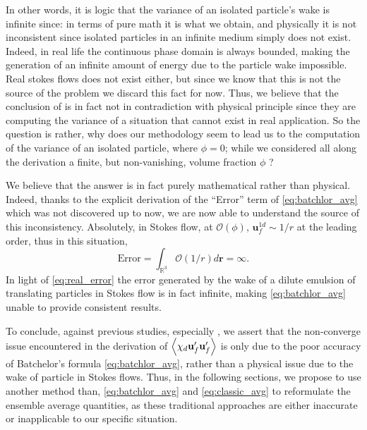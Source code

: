 In other words, it is logic that the variance of an isolated particle's wake is infinite since: in terms of pure math it is what we obtain, and physically it is not inconsistent since isolated particles in an infinite medium simply does not exist.
Indeed, in real life the continuous phase domain is always bounded, making the generation of an infinite amount of energy due to the particle wake impossible. 
Real stokes flows does not exist either, but since we know that this is not the source of the problem \citet{koch1993hydrodynamic} we discard this fact for now. 
Thus, we believe that the conclusion of \citet{caflisch1985variance} is in fact not in contradiction with physical principle since they are computing the variance of a situation that cannot exist in real application. 
So the question is rather, why does our methodology seem to lead us to the computation of the variance of an isolated particle, where $\phi =0$; while we considered all along the derivation a finite, but non-vanishing, volume fraction $\phi$ ?

We believe that the answer is in fact purely mathematical rather than physical. 
Indeed, thanks to the explicit derivation of the ``Error'' term of \ref{eq:batchlor_avg} which was not discovered up to now, we are now able to understand the source of this inconsistency. 
Absolutely, in Stokes flow, at $\mathcal{O}(\phi)$, $\textbf{u}_f^{1d} \sim 1/r$ at the leading order, thus in this situation, 
\begin{equation}
    \text{Error}
    = 
    \int_{\mathbb{R}^3} 
    \mathcal{O}(1/r) d\textbf{r}
    = \infty. 
    \label{eq:real_error}
\end{equation}
In light of \ref{eq:real_error} the error generated by the wake of a dilute emulsion of translating particles in Stokes flow is in fact infinite, making \ref{eq:batchlor_avg} unable to provide consistent results. 


To conclude, against previous studies, especially \citet{caflisch1985variance}, we assert that the non-converge issue encountered in the derivation of $\left<\chi_d \textbf{u}_f'\textbf{u}_f'\right>$ is only due to the poor accuracy of Batchelor's formula \eqref{eq:batchlor_avg}, rather than a physical issue due to the wake of particle in Stokes flows. 
Thus, in the following sections, we propose to use another method than, \ref{eq:batchlor_avg} and \ref{eq:classic_avg} to reformulate the ensemble average quantities, as these traditional approaches are either inaccurate or inapplicable to our specific situation. 





